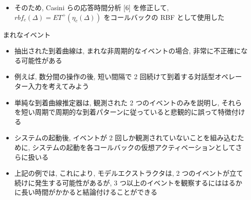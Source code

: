 \begin{frame}{}
    \begin{itemize}
        \item そのため, Casini らの応答時間分析 [6] を修正して, $r b f_{c}(\Delta)=E T^{+}\left(\eta_{c}(\Delta)\right)$ をコールバックの RBF として使用した
    \end{itemize}
\end{frame}

\begin{frame}{まれなイベント}
    \begin{itemize}
        \item 抽出された到着曲線は, まれな非周期的なイベントの場合, 非常に不正確になる可能性がある
\item 例えば, 数分間の操作の後, 短い間隔で 2 回続けて到着する対話型オペレーター入力を考えてみよう
\item 単純な到着曲線推定器は, 観測された 2 つのイベントのみを説明し, それらを短い周期で周期的な到着パターンに従っていると悲観的に誤って特徴付ける
\item システムの起動後, イベントが 2 回しか観測されていないことを組み込むために, システムの起動を各コールバックの仮想アクティベーションとしてさらに扱いる
\item 上記の例では, これにより, モデルエクストラクタは, 2 つのイベントが立て続けに発生する可能性があるが, 3 つ以上のイベントを観察するにははるかに長い時間がかかると結論付けることができる
    \end{itemize}
\end{frame}
